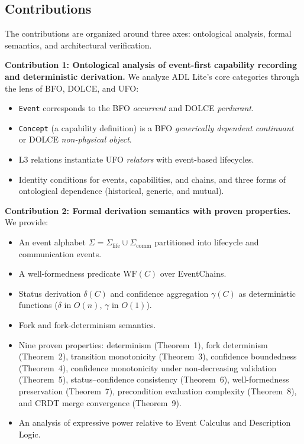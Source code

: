 \subsection{Contributions}\label{subsec:contributions}

The contributions are organized around three axes: ontological analysis, formal semantics, and architectural verification.

\textbf{Contribution 1: Ontological analysis of event-first capability recording and deterministic derivation.} We analyze ADL Lite's core categories through the lens of BFO, DOLCE, and UFO:
\begin{itemize}[leftmargin=2em]
    \item \texttt{Event} corresponds to the BFO \emph{occurrent} and DOLCE \emph{perdurant}.
    \item \texttt{Concept} (a capability definition) is a BFO \emph{generically dependent continuant} or DOLCE \emph{non-physical object}.
    \item L3 relations instantiate UFO \emph{relators} with event-based lifecycles.
    \item Identity conditions for events, capabilities, and chains, and three forms of ontological dependence (historical, generic, and mutual).
\end{itemize}

\textbf{Contribution 2: Formal derivation semantics with proven properties.} We provide:
\begin{itemize}[leftmargin=2em]
    \item An event alphabet $\Sigma = \Sigma_{\text{life}} \cup \Sigma_{\text{comm}}$ partitioned into lifecycle and communication events.
    \item A well-formedness predicate $\text{WF}(C)$ over EventChains.
    \item Status derivation $\delta(C)$ and confidence aggregation $\gamma(C)$ as deterministic functions ($\delta$ in $O(n)$, $\gamma$ in $O(1)$).
    \item Fork and fork-determinism semantics.
    \item Nine proven properties: determinism (Theorem~1), fork determinism (Theorem~2), transition monotonicity (Theorem~3), confidence boundedness (Theorem~4), confidence monotonicity under non-decreasing validation (Theorem~5), status--confidence consistency (Theorem~6), well-formedness preservation (Theorem~7), precondition evaluation complexity (Theorem~8), and CRDT merge convergence (Theorem~9).
    \item An analysis of expressive power relative to Event Calculus and Description Logic.
\end{itemize}

